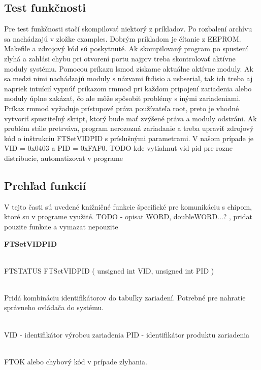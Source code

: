 \subsection{Test funkčnosti}
Pre test funkčnosti stačí skompilovať niektorý z príkladov. Po rozbalení archívu sa nachádzajú v zložke examples.
Dobrým príkladom je čítanie z EEPROM. Makefile a zdrojový kód sú poskytnuté. Ak skompilovaný program po spustení zlyhá 
a zahlási chybu pri otvorení portu najprv treba skontrolovať aktívne moduly systému. Pomocou príkazu lsmod získame
aktuálne aktívne moduly. Ak sa medzi nimi nachádzajú moduly s názvami ftdi\textunderscore sio a usbserial, tak ich treba aj napriek 
intuícií vypnúť príkazom rmmod pri každom pripojení zariadenia alebo moduly úplne zakázať, čo ale môže spôsobiť problémy
s inými zariadeniami. Príkaz rmmod vyžaduje prístupové práva používateľa root, preto je vhodné vytvoriť spustiteľný skript,
ktorý bude mať zvýšené práva a moduly odstráni. Ak problém stále pretrváva, program nerozozná zariadanie a treba upraviť
zdrojový kód o inštrukciu FT\textunderscore SetVIDPID s príslušnými parametrami. V našom prípade je VID = 0x0403 a PID = 0xFAF0. 
TODO kde vytiahnut vid pid pre rozne distribucie, automatizovat v programe


\subsection{Prehľad funkcií}
V tejto časti sú uvedené knižničné funkcie špecifické pre komunikáciu s chipom, ktoré su v programe využité. 
TODO - opisat WORD, doubleWORD...? ,  pridat pouzite funkcie a vymazat nepouzite \newline

\textbf{\large FT\textunderscore SetVIDPID}
\begin{description} \itemsep1pt \parskip0pt 
  \item[Definícia] \hfill \\	FT\textunderscore STATUS FT\textunderscore SetVIDPID ( unsigned int VID, unsigned int PID )
  \item[Popis] 	\hfill \\ Pridá kombináciu identifikátorov do tabuľky zariadení. Potrebné pre nahratie správneho ovládača do systému.
  \item[Parametre]  \hfill \\ VID - identifikátor výrobcu zariadenia \newline PID - identifikátor produktu zariadenia 
  \item[Návratová hodnota] \hfill \\ FT\textunderscore OK alebo chybový kód v prípade zlyhania.
\end{description} 
\hfill \break

